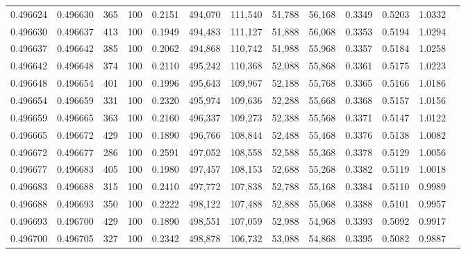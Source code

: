 \begin{tabular}{rrrrrrrrrrrrr}
0.496624 & 0.496630 &   365 & 100 &                                     0.2151 & 494,070 & 111,540 &  51,788 &  56,168 & 0.3349 & 0.5203 & 1.0332 \\
0.496630 & 0.496637 &   413 & 100 &                                     0.1949 & 494,483 & 111,127 &  51,888 &  56,068 & 0.3353 & 0.5194 & 1.0294 \\
0.496637 & 0.496642 &   385 & 100 &                                     0.2062 & 494,868 & 110,742 &  51,988 &  55,968 & 0.3357 & 0.5184 & 1.0258 \\
0.496642 & 0.496648 &   374 & 100 &                                     0.2110 & 495,242 & 110,368 &  52,088 &  55,868 & 0.3361 & 0.5175 & 1.0223 \\
0.496648 & 0.496654 &   401 & 100 &                                     0.1996 & 495,643 & 109,967 &  52,188 &  55,768 & 0.3365 & 0.5166 & 1.0186 \\
0.496654 & 0.496659 &   331 & 100 &                                     0.2320 & 495,974 & 109,636 &  52,288 &  55,668 & 0.3368 & 0.5157 & 1.0156 \\
0.496659 & 0.496665 &   363 & 100 &                                     0.2160 & 496,337 & 109,273 &  52,388 &  55,568 & 0.3371 & 0.5147 & 1.0122 \\
0.496665 & 0.496672 &   429 & 100 &                                     0.1890 & 496,766 & 108,844 &  52,488 &  55,468 & 0.3376 & 0.5138 & 1.0082 \\
0.496672 & 0.496677 &   286 & 100 &                                     0.2591 & 497,052 & 108,558 &  52,588 &  55,368 & 0.3378 & 0.5129 & 1.0056 \\
0.496677 & 0.496683 &   405 & 100 &                                     0.1980 & 497,457 & 108,153 &  52,688 &  55,268 & 0.3382 & 0.5119 & 1.0018 \\
0.496683 & 0.496688 &   315 & 100 &                                     0.2410 & 497,772 & 107,838 &  52,788 &  55,168 & 0.3384 & 0.5110 & 0.9989 \\
0.496688 & 0.496693 &   350 & 100 &                                     0.2222 & 498,122 & 107,488 &  52,888 &  55,068 & 0.3388 & 0.5101 & 0.9957 \\
0.496693 & 0.496700 &   429 & 100 &                                     0.1890 & 498,551 & 107,059 &  52,988 &  54,968 & 0.3393 & 0.5092 & 0.9917 \\
0.496700 & 0.496705 &   327 & 100 &                                     0.2342 & 498,878 & 106,732 &  53,088 &  54,868 & 0.3395 & 0.5082 & 0.9887 \\

\end{tabular}

